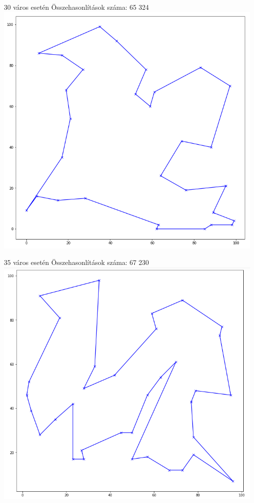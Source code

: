 30 város esetén
Összehasonlítások száma: 65 324
\includegraphics[scale=0.4]{images/30.png}

35 város esetén
Összehasonlítások száma: 67 230
\includegraphics[scale=0.4]{images/35.png}

